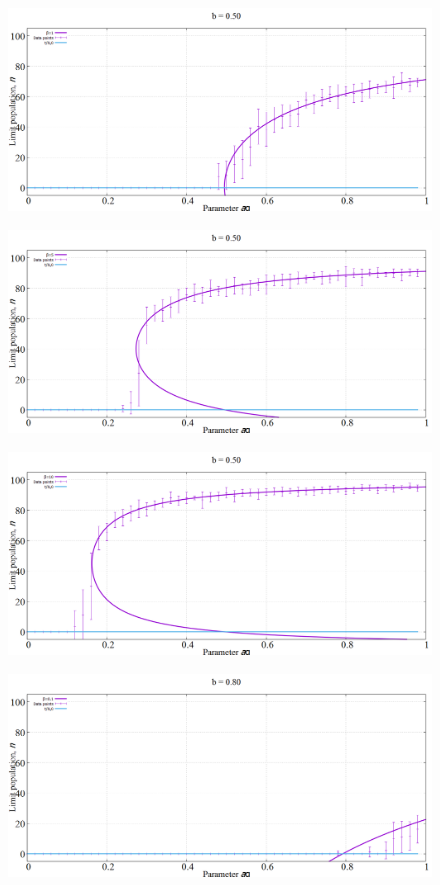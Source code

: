 \begin{figure}[h!]
 \centering
  \includegraphics[width=\linewidth]{images/appendix/simexpt/8.png}
\end{figure}
\newpage
\begin{figure}[h!]
 \centering
  \includegraphics[width=\linewidth]{images/appendix/simexpt/9.png}
\end{figure}

\begin{figure}[h!]
 \centering
  \includegraphics[width=\linewidth]{images/appendix/simexpt/10.png}
\end{figure}
\newpage
\begin{figure}[h!]
 \centering
  \includegraphics[width=0.6\linewidth]{images/appendix/simexpt/11.png}
\end{figure}

